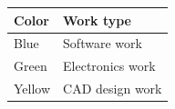 \begin{table}[H]
    \centering
    \renewcommand{\arraystretch}{1}
    \begin{tabular}{|p{}|p{}|}
        \hline
        \textbf{Color} & \textbf{Work type} \\
        \hline
        \rowcolor{contributionsoftware}
        Blue & Software work \\
        \hline
        \rowcolor{contributionelectronics}
        Green & Electronics work \\
        \hline
        \rowcolor{contributioncad}
        Yellow & CAD design work \\
        \hline
    \end{tabular}
\end{table}
\endgroup